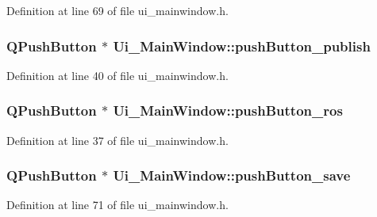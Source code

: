 Definition at line 69 of file ui\+\_\+mainwindow.\+h.

\subsubsection[{\texorpdfstring{push\+Button\+\_\+publish}{pushButton_publish}}]{\setlength{\rightskip}{0pt plus 5cm}Q\+Push\+Button $\ast$ Ui\+\_\+\+Main\+Window\+::push\+Button\+\_\+publish}\hypertarget{class_ui___main_window_a5ecf2ba9a2778d906864493f45ee67a5}{}\label{class_ui___main_window_a5ecf2ba9a2778d906864493f45ee67a5}


Definition at line 40 of file ui\+\_\+mainwindow.\+h.

\subsubsection[{\texorpdfstring{push\+Button\+\_\+ros}{pushButton_ros}}]{\setlength{\rightskip}{0pt plus 5cm}Q\+Push\+Button $\ast$ Ui\+\_\+\+Main\+Window\+::push\+Button\+\_\+ros}\hypertarget{class_ui___main_window_aa92103c3833c2d9702d9fe03df3a48f4}{}\label{class_ui___main_window_aa92103c3833c2d9702d9fe03df3a48f4}


Definition at line 37 of file ui\+\_\+mainwindow.\+h.

\subsubsection[{\texorpdfstring{push\+Button\+\_\+save}{pushButton_save}}]{\setlength{\rightskip}{0pt plus 5cm}Q\+Push\+Button $\ast$ Ui\+\_\+\+Main\+Window\+::push\+Button\+\_\+save}\hypertarget{class_ui___main_window_a6c47f6988713a827ec2fff8e091bf029}{}\label{class_ui___main_window_a6c47f6988713a827ec2fff8e091bf029}


Definition at line 71 of file ui\+\_\+mainwindow.\+h.

